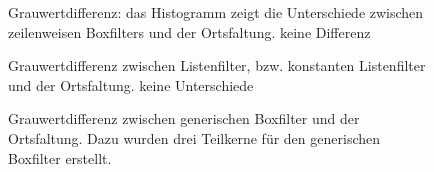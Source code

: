 \documentclass[a4paper,12pt]{article}
\begin{document}
\begin{figure}[htbp]
\caption{Grauwertdifferenz: das Histogramm zeigt die Unterschiede zwischen
zeilenweisen Boxfilters und der Ortsfaltung. keine Differenz}%
\label{figure_border_BoxnotSep}
\end{figure}


\begin{figure}[htbp]
\caption{Grauwertdifferenz zwischen Listenfilter, bzw. konstanten
Listenfilter und der Ortsfaltung. keine Unterschiede }%
\label{figure_hist_listFilter}
\end{figure}

\begin{figure}[htbp]
\caption{Grauwertdifferenz zwischen generischen Boxfilter und der Ortsfaltung.
Dazu wurden drei Teilkerne für den generischen Boxfilter erstellt. }%
\label{figure_hist_genBox}
\end{figure}
\end{document}
